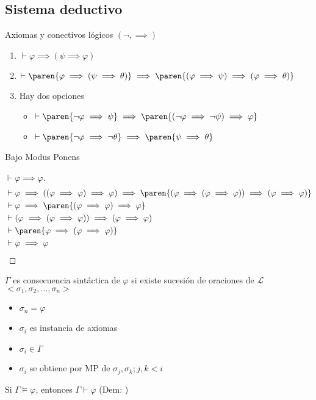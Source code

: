 \subsection{Sistema deductivo}
Axiomas y conectivos lógicos $(\neg,\implies)$
\begin{enumerate}
	\item $\vdash\varphi\implies(\psi\implies\varphi)$
	\item $\vdash\paren{\varphi\implies(\psi\implies\theta)}\implies\paren{(\varphi\implies\psi)\implies(\varphi\implies\theta)}$
	\item Hay dos opciones\begin{itemize}
		      \item $\vdash\paren{\neg\varphi\implies\psi}\implies\paren{(\neg\varphi\implies\neg\psi)\implies\varphi}$
		      \item $\vdash\paren{\neg\varphi\implies\neg\theta}\implies\paren{\psi\implies\theta}$
	      \end{itemize}
\end{enumerate}
Bajo Modus Ponens
\begin{proof}[$\vdash\varphi\implies\varphi$]
	\begin{align*}
		 & \vdash\varphi\implies((\varphi\implies\varphi)\implies\varphi)\implies\paren{(\varphi\implies(\varphi\implies\varphi))\implies(\varphi\implies\varphi)} \\
		 & \vdash\varphi\implies\paren{(\varphi\implies\varphi)\implies\varphi}                                                                                    \\
		 & \vdash(\varphi\implies(\varphi\implies\varphi))\implies(\varphi\implies\varphi)                                                                         \\
		 & \vdash\paren{\varphi\implies(\varphi\implies\varphi)}                                                                                                   \\
		 & \vdash\varphi\implies\varphi
	\end{align*}
\end{proof}
\begin{defn}
	$\Gamma$ es consecuencia sintáctica de $\varphi$ si existe sucesión de oraciones de $\mathcal{L}$ $<\sigma_1,\sigma_2,...,\sigma_n>$
	\begin{itemize}
		\item $\sigma_n=\varphi$
		\item $\sigma_i$ es instancia de axiomas
		\item $\sigma_i\in\Gamma$
		\item $\sigma_i$ se obtiene por MP de $\sigma_j,\sigma_k;j,k<i$
	\end{itemize}
\end{defn}
\begin{thm}[Completitud]
	Si $\Gamma\models\varphi$, entonces $\Gamma\vdash\varphi$ (Dem: \cite{mendelson2009introduction})
\end{thm}


